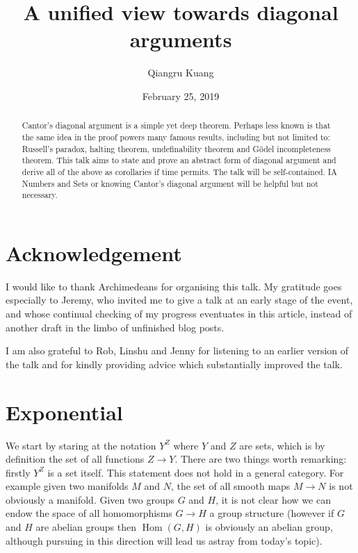 \documentclass[a4paper]{article}
\title{A unified view towards diagonal arguments}
\author{Qiangru Kuang}
\date{February 25, 2019}
\begin{document}
\maketitle

\begin{abstract}
  Cantor's diagonal argument is a simple yet deep theorem. Perhaps less known is that the same idea in the proof powers many famous results, including but not limited to: Russell's paradox, halting theorem, undefinability theorem and Gödel incompleteness theorem. This talk aims to state and prove an abstract form of diagonal argument and derive all of the above as corollaries if time permits. The talk will be self-contained. IA Numbers and Sets or knowing Cantor's diagonal argument will be helpful but not necessary.
\end{abstract}

\section{Acknowledgement}

I would like to thank Archimedeans for organising this talk. My gratitude goes especially to Jeremy, who invited me to give a talk at an early stage of the event, and whose continual checking of my progress eventuates in this article, instead of another draft in the limbo of unfinished blog posts.

I am also grateful to Rob, Linshu and Jenny for listening to an earlier version of the talk and for kindly providing advice which substantially improved the talk.

\section{Exponential}

We start by staring at the notation \(Y^Z\) where \(Y\) and \(Z\) are sets, which is by definition the set of all functions \(Z \to Y\). There are two things worth remarking: firstly \(Y^Z\) is a set itself. This statement does not hold in a general category. For example given two manifolds \(M\) and \(N\), the set of all smooth maps \(M \to N\) is not obviously a manifold. Given two groups \(G\) and \(H\), it is not clear how we can endow the space of all homomorphisms \(G \to H\) a group structure (however if \(G\) and \(H\) are abelian groups then \(\operatorname{Hom}(G, H)\) is obviously an abelian group, although pursuing in this direction will lead us astray from today's topic).
\end{document}

